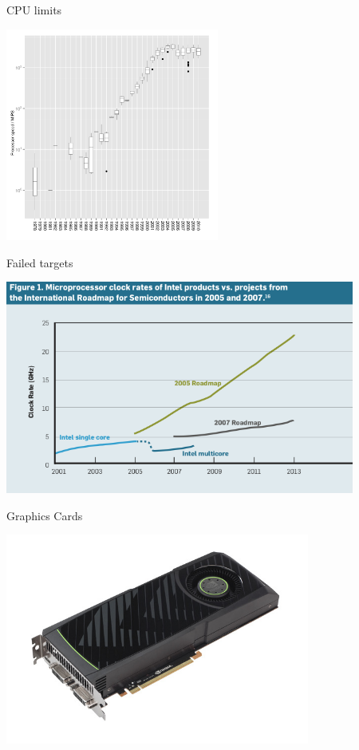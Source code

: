 \documentclass{beamer}
\begin{document}
\begin{frame}{CPU limits}
	\begin{center}
		\includegraphics[height=7cm]{clockspeed.pdf}
	\end{center}
\end{frame}

\begin{frame}{Failed targets}
	\begin{center}
		\includegraphics[height=7cm]{clockrates.png}
	\end{center}
\end{frame}


\begin{frame}{Graphics Cards}
	\begin{center}
		\includegraphics[width=10cm]{gtx580}
	\end{center}
\end{frame}
\end{document}

